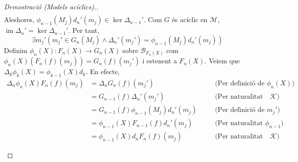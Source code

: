 \documentclass[compress]{article}
\theoremstyle{definition}
\DeclareMathOperator{\im}{im}
\begin{document}
\begin{proof}[Demostració (Models acíclics).]
\begin{align*}
    \end{align*}
    Aleshores, $\phi_{n-1}(M_{j})d_{n}'(m_{j})\in\ker\Delta_{n-1}'$. Com $G$ és acíclic en $\mathscr{M}$, $\im\Delta_{n}'=\ker\Delta_{n-1}'$. Per tant,
    \begin{equation*}
        \exists m_{j}'(m_{j}'\in G_{n}(M_{j})\land\Delta_{n}'(m_{j}')=\phi_{n-1}(M_{j})d_{n}'(m_{j}))
    \end{equation*}
    Definim $\phi_{n}(X):F_{n}(X)\rightarrow G_{n}(X)$ sobre $\mathscr{B}_{F_{n}(X)}$ com $\phi_{n}(X)(F_{n}(f)(m_{j}))=G_{n}(f)(m_{j}')$ i estenent a $F_{n}(X)$. Veiem que $\Delta_{k}\phi_{k}(X)=\phi_{k-1}(X)d_{k}$. En efecte,
    \begin{align*}
        \Delta_{n}\phi_{n}(X)F_{n}(f)(m_{j})
        &=\Delta_{n}G_{n}(f)(m_{j}')
        &\quad&\textrm{(Per definició de $\phi_{n}(X)$)}\\
        &=G_{n-1}(f)\Delta_{n}'(m_{j}')
        &\quad&\textrm{(Per naturalitat dels morfismes de $\mathscr{K}$)}\\
        &=G_{n-1}(f)\phi_{n-1}(M_{j})d_{n}'(m_{j})&\quad&\textrm{(Per definició de $m_{j}'$)}\\
        &=\phi_{n-1}(X)F_{n-1}(f)d_{n}'(m_{j})&\quad&\textrm{(Per naturalitat $\phi_{n-1}$)}\\
        &=\phi_{n-1}(X)d_{n}F_{n}(f)(m_{j})&\quad&\textrm{(Per naturalitat dels morfismes de $\mathscr{K}$)}
    \end{align*}
    \begin{center}
    \end{center}

\end{proof}
\end{document}

